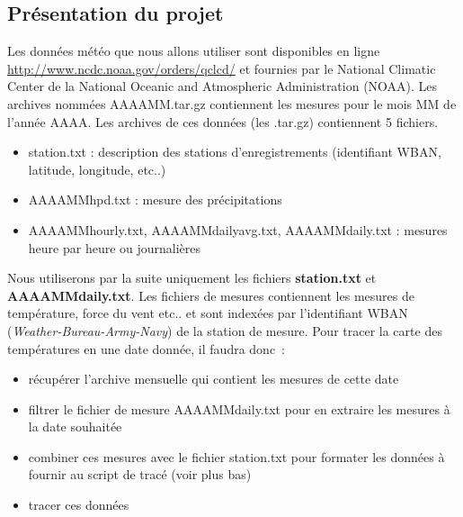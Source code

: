 \subsection{Présentation du projet}

Les données météo que nous allons utiliser sont disponibles en ligne
\url{http://www.ncdc.noaa.gov/orders/qclcd/} et fournies par le
National Climatic Center de la National Oceanic and Atmospheric
Administration (NOAA). Les archives nommées AAAAMM.tar.gz
contiennent les mesures pour le mois MM de l'année AAAA. Les archives de ces données (les .tar.gz)
contiennent 5 fichiers. 
\begin{itemize}
\item station.txt : description des stations d'enregistrements
  (identifiant WBAN, latitude, longitude, etc..)
\item AAAAMMhpd.txt : mesure des précipitations
\item AAAAMMhourly.txt, AAAAMMdailyavg.txt, AAAAMMdaily.txt : mesures
  heure par heure ou journalières\\
\end{itemize}

Nous utiliserons par la suite uniquement les fichiers \textbf{station.txt} et
\textbf{AAAAMMdaily.txt}. Les fichiers de mesures contiennent les mesures de
température, force du vent etc.. et sont indexées par l'identifiant
WBAN (\emph{Weather-Bureau-Army-Navy}) de la station de mesure. Pour tracer la carte des températures en
une date donnée, il faudra donc~:
\begin{itemize}
\item récupérer l'archive mensuelle qui contient les mesures de cette date
\item filtrer le fichier de mesure AAAAMMdaily.txt pour en extraire
  les mesures à la date souhaitée
\item combiner ces mesures avec le fichier station.txt pour formater
  les données à fournir au script de tracé (voir plus bas)
\item tracer ces données
\end{itemize}

